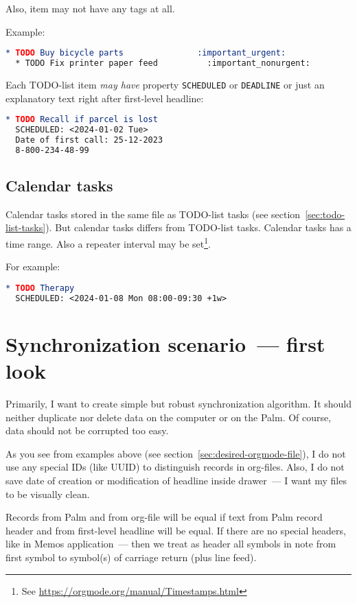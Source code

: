 \documentclass[a4paper,12pt,oneside]{scrartcl}
\begin{document}
Also, item may not have any tags at all.

Example:
\begin{lstlisting}[language=org]
  * TODO Buy bicycle parts               :important_urgent:
  * TODO Fix printer paper feed          :important_nonurgent:
\end{lstlisting}

Each TODO-list item \textit{may have} property \texttt{SCHEDULED} or
\texttt{DEADLINE} or just an explanatory text right after first-level headline:
\begin{lstlisting}[language=org]
  * TODO Recall if parcel is lost
  SCHEDULED: <2024-01-02 Tue>
  Date of first call: 25-12-2023
  8-800-234-48-99
\end{lstlisting}

\subsection{Calendar tasks}
\label{sec:calendar-tasks}

Calendar tasks stored in the same file as TODO-list tasks (see
section~\ref{sec:todo-list-tasks}). But calendar tasks differs from TODO-list
tasks. Calendar tasks has a time range. Also a repeater interval may be
set\footnote{See \url{https://orgmode.org/manual/Timestamps.html}}.

For example:
\begin{lstlisting}[language=org]
  * TODO Therapy
  SCHEDULED: <2024-01-08 Mon 08:00-09:30 +1w>
\end{lstlisting}

\section{Synchronization scenario~--- first look}
\label{sec:synchr-scen-first-look}

Primarily, I want to create simple but robust synchronization algorithm. It
should neither duplicate nor delete data on the computer or on the Palm. Of
course, data should not be corrupted too easy.

As you see from examples above (see section~\ref{sec:desired-orgmode-file}), I
do not use any special IDs (like UUID) to distinguish records in
org-files. Also, I do not save date of creation or modification of headline
inside drawer~--- I want my files to be visually clean.

Records from Palm and from org-file will be equal if text from Palm record
header and from first-level headline will be equal. If there are no special
headers, like in Memos application~--- then we treat as header all symbols in
note from first symbol to symbol(s) of carriage return (plus line feed).
\end{document}
